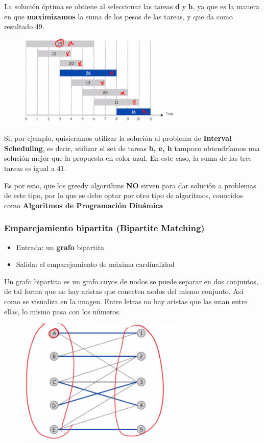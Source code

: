 \documentclass[letterpaper]{article}
\begin{document}
La solución óptima se obtiene al seleccionar las tareas \textbf{d} y \textbf{h}, ya que es la
manera en que \textbf{maximizamos} la suma de los pesos de las tareas, y que da como
resultado 49.

\begin{figure}
    \includegraphics[width=0.7\textwidth, height=0.4\textwidth]
        {./img/weighted_interval_scheduling.png}
\end{figure}

Si, por ejemplo, quisieramos utilizar la solución al problema de \textbf{Interval
Scheduling}, es decir, utilizar el set de tareas \textbf{b, e, h} tampoco obtendríamos
una solución mejor que la propuesta en color azul. En este caso, la suma de las
tres tareas es igual a 41.

Es por esto, que los greedy algorithms \textbf{NO} sirven para dar solución a
problemas de este tipo, por lo que se debe optar por otro tipo de algoritmos,
conocidos como \textbf{Algoritmos de Programación Dinámica}
\subsubsection{Emparejamiento bipartita (Bipartite Matching)}
\label{sec:orgd55a3b5}
\begin{itemize}
\item Entrada: un \textbf{grafo} bipartita
\item Salida: el emparejamiento de máxima cardinalidad
\end{itemize}

Un grafo bipartita es un grafo cuyos de nodos se puede separar en dos conjuntos,
de tal forma que no hay aristas que conecten nodos del mismo conjunto. Así como
se visualiza en la imagen. Entre letras no hay aristas que las unan entre ellas,
lo mismo pasa con los números.

\begin{figure}
    \includegraphics[width=0.7\textwidth, height=0.4\textwidth]
        {./img/bipartite_graph.png}
\end{figure}
\end{document}
